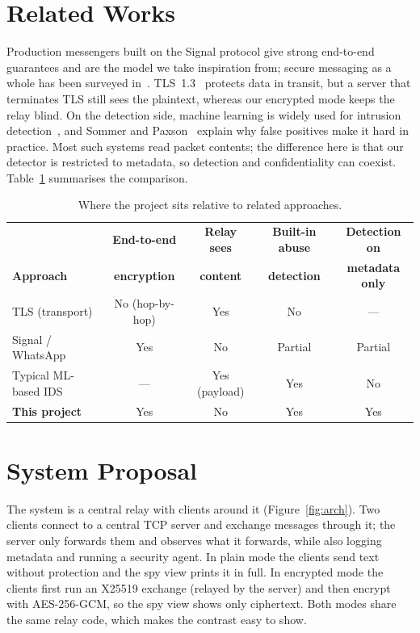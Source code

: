\documentclass[onecolumn]{article}
\begin{document}
\section{Related Works}
\label{sec:related}

Production messengers built on the Signal protocol give strong end-to-end guarantees and are the model we take inspiration from; secure messaging as a whole has been surveyed in~\cite{c8b}. TLS~1.3~\cite{c10} protects data in transit, but a server that terminates TLS still sees the plaintext, whereas our encrypted mode keeps the relay blind. On the detection side, machine learning is widely used for intrusion detection~\cite{c12}, and Sommer and Paxson~\cite{c13} explain why false positives make it hard in practice. Most such systems read packet contents; the difference here is that our detector is restricted to metadata, so detection and confidentiality can coexist. Table~\ref{tab:compare} summarises the comparison.

\begin{table}[htbp]
\centering
\caption{Where the project sits relative to related approaches.}
\label{tab:compare}
\small
\begin{tabular}{@{}lcccc@{}}
\toprule
 & \textbf{End-to-end} & \textbf{Relay sees} & \textbf{Built-in abuse} & \textbf{Detection on} \\
\textbf{Approach} & \textbf{encryption} & \textbf{content} & \textbf{detection} & \textbf{metadata only} \\
\midrule
TLS (transport)       & No (hop-by-hop) & Yes           & No      & --- \\
Signal / WhatsApp     & Yes             & No            & Partial & Partial \\
Typical ML-based IDS  & ---             & Yes (payload) & Yes     & No \\
\textbf{This project} & Yes             & No            & Yes     & Yes \\
\bottomrule
\end{tabular}
\end{table}

\section{System Proposal}
\label{sec:proposal}

The system is a central relay with clients around it (Figure~\ref{fig:arch}). Two clients connect to a central TCP server and exchange messages through it; the server only forwards them and observes what it forwards, while also logging metadata and running a security agent. In plain mode the clients send text without protection and the spy view prints it in full. In encrypted mode the clients first run an X25519 exchange (relayed by the server) and then encrypt with AES-256-GCM, so the spy view shows only ciphertext. Both modes share the same relay code, which makes the contrast easy to show.
\end{document}
